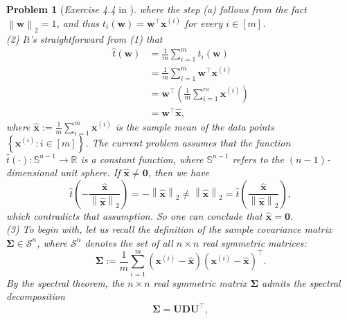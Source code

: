 \documentclass[11pt]{article}
\newtheorem{problem}{Problem}
\begin{document}
\begin{problem} [\emph{Exercise 4.4} in \cite{calafiore2014optimization}]
{where the step (a) follows from the fact $\left\| \mathbf{w} \right\|_2 = 1$, and thus $t_i (\mathbf{w}) = \mathbf{w}^{\top} \mathbf{x}^{(i)}$ for every $i \in [m]$. \\ [10pt]
\indent (2) It's straightforward from (1) that
\begin{equation*}
    \begin{split}
        \hat{t}(\mathbf{w}) &= \frac{1}{m} \sum_{i=1}^{m} t_i(\mathbf{w}) \\
        &= \frac{1}{m} \sum_{i=1}^{m} \mathbf{w}^{\top} \mathbf{x}^{(i)} \\
        &= \mathbf{w}^{\top} \left( \frac{1}{m} \sum_{i=1}^{m} \mathbf{x}^{(i)} \right) \\
        &= \mathbf{w}^{\top} \hat{\mathbf{x}},
    \end{split}
\end{equation*}
where $\hat{\mathbf{x}} := \frac{1}{m} \sum_{i=1}^{m} \mathbf{x}^{(i)}$ is the sample mean of the data points $\left\{ \mathbf{x}^{(i)} : i \in [m] \right\}$. The current problem assumes that the function $\hat{t} (\cdot) : \mathbb{S}^{n-1} \rightarrow \mathbb{R}$ is a constant function, where $\mathbb{S}^{n-1}$ refers to the $(n-1)$-dimensional unit sphere. If $\hat{\mathbf{x}} \neq \mathbf{0}$, then we have
\begin{equation*}
    \hat{t} \left( - \frac{\hat{\mathbf{x}}}{\left\| \hat{\mathbf{x}} \right\|_2} \right) = - \left\| \hat{\mathbf{x}} \right\|_2 \neq
    \left\| \hat{\mathbf{x}} \right\|_2 = \hat{t} \left( \frac{\hat{\mathbf{x}}}{\left\| \hat{\mathbf{x}} \right\|_2} \right),
\end{equation*}
which contradicts that assumption. So one can conclude that $\hat{\mathbf{x}} = \mathbf{0}$. \\ [10pt]
\indent (3) To begin with, let us recall the definition of the sample covariance matrix $\mathbf{\Sigma} \in \mathcal{S}^n$, where $\mathcal{S}^n$ denotes the set of all $n \times n$ real symmetric matrices:
\begin{equation*}
    \mathbf{\Sigma} := \frac{1}{m} \sum_{i=1}^{m} \left( \mathbf{x}^{(i)} - \hat{\mathbf{x}} \right) \left( \mathbf{x}^{(i)} - \hat{\mathbf{x}} \right)^{\top}.
\end{equation*}
By the spectral theorem, the $n \times n$ real symmetric matrix $\mathbf{\Sigma}$ admits the spectral decomposition
\begin{equation}
    \label{eqn1.3}
    \mathbf{\Sigma} = \mathbf{U} \mathbf{D} \mathbf{U}^{\top},
\end{equation}
}
\end{problem}
\end{document}
